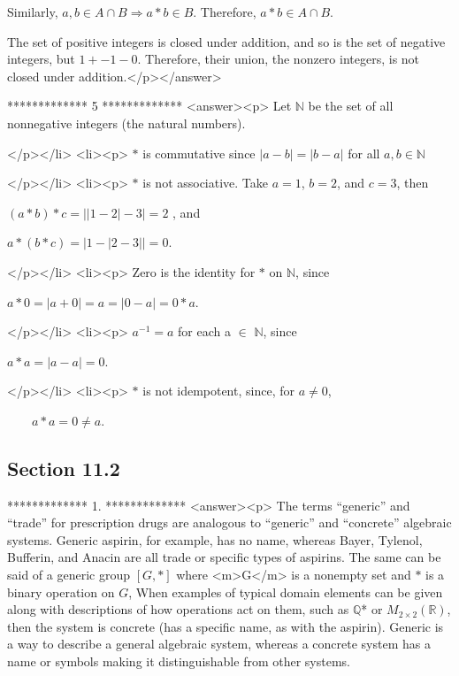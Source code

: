      Similarly, \(a, b \in  A \cap B\Rightarrow  a*b\in B\). Therefore, \(a * b \in  A \cap  B\).



The set of positive integers is closed under addition, and so is the set of negative integers, but \(1 + -1 - 0\). Therefore, their union, the nonzero
integers, is not closed under addition.</p></answer>


*************
5
*************
<answer><p> Let $\mathbb{N}$ be the set of all nonnegative integers (the natural numbers).

</p></li>
<li><p> \(*\) is commutative since \(\left| a-b\right| =\left| b-a\right|\) for all \(a, b \in  \mathbb{N}\)

</p></li>
<li><p> \(*\) is not associative. Take \(a = 1\), \(b = 2\), and \(c = 3\), then



\((a * b) * c =\left| \left| 1-2\right| -3\right| =2\) , and



\(a * (b * c) = \left| 1-\left| 2-3\right| \right| = 0\).

</p></li>
<li><p> Zero is the identity for \(*\) on $\mathbb{N}$, since



\(a*0=\left| a+0\right|  = a = \left| 0-a\right| = 0 * a.\)

</p></li>
<li><p>  \(a^{-1}=a\)  for each a $\in $ $\mathbb{N}$, since



\(a * a=\left| a-a\right|  = 0\).

</p></li>
<li><p> \(*\) is not idempotent, since, for \(a\neq 0\),



$\quad \quad $\(a * a =0 \neq a\).


\subsection{Section 11.2}

*************
1.
*************
<answer><p> The terms {``}generic{''} and {``}trade{''} for prescription drugs are analogous to {``}generic{''} and {``}concrete{''} algebraic systems. {
}Generic aspirin, for example, has no name, whereas Bayer, Tylenol, Bufferin, and Anacin are all trade or specific types of aspirins. The same can
be said of a generic group \([G, *]\) where <m>G</m> is a nonempty set and \(*\) is a binary operation on \(G\), When examples of typical domain
elements can be given along with descriptions of how operations act on them, such as $\mathbb{Q}$* or \(M_{2\times 2}(\mathbb{R})\), then the system
is concrete (has a specific name, as with the aspirin). Generic is a way to describe a general algebraic system, whereas a concrete system has a
name or symbols making it distinguishable from other systems.

